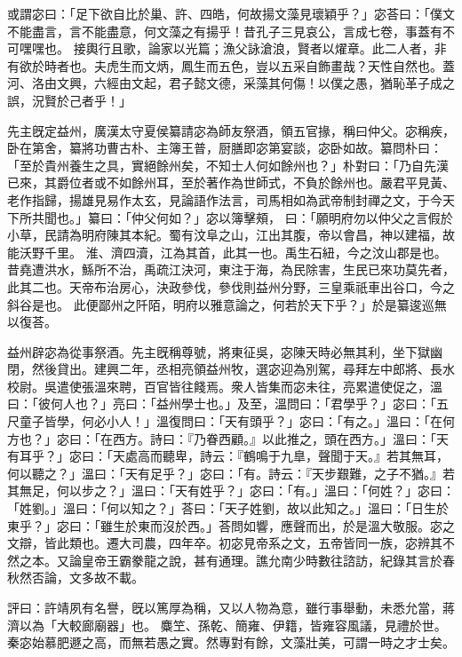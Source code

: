 \begin{pinyinscope}
 
或謂宓曰：「足下欲自比於巢、許、四皓，何故揚文藻見瓌穎乎？」宓荅曰：「僕文不能盡言，言不能盡意，何文藻之有揚乎！昔孔子三見哀公，言成七卷，事蓋有不可嘿嘿也。
 接輿行且歌，論家以光篇；漁父詠滄浪，賢者以燿章。此二人者，非有欲於時者也。夫虎生而文炳，鳳生而五色，豈以五采自飾畫哉？天性自然也。蓋河、洛由文興，六經由文起，君子懿文德，采藻其何傷！以僕之愚，猶恥革子成之誤，況賢於己者乎！」
 
 
先主旣定益州，廣漢太守夏侯纂請宓為師友祭酒，領五官掾，稱曰仲父。宓稱疾，卧在第舍，纂將功曹古朴、主簿王普，厨膳即宓第宴談，宓卧如故。纂問朴曰：「至於貴州養生之具，實絕餘州矣，不知士人何如餘州也？」朴對曰：「乃自先漢已來，其爵位者或不如餘州耳，至於著作為世師式，不負於餘州也。嚴君平見黃、老作指歸，揚雄見易作太玄，見論語作法言，司馬相如為武帝制封禪之文，于今天下所共聞也。」纂曰：「仲父何如？」宓以簿擊頰，
 曰：「願明府勿以仲父之言假於小草，民請為明府陳其本紀。蜀有汶阜之山，江出其腹，帝以會昌，神以建福，故能沃野千里。
 淮、濟四瀆，江為其首，此其一也。禹生石紐，今之汶山郡是也。
 昔堯遭洪水，鯀所不治，禹疏江決河，東注于海，為民除害，生民已來功莫先者，此其二也。天帝布治房心，決政參伐，參伐則益州分野，三皇乘祇車出谷口，今之斜谷是也。
 此便鄙州之阡陌，明府以雅意論之，何若於天下乎？」於是纂逡巡無以復荅。
 
 
 
 
 益州辟宓為從事祭酒。先主旣稱尊號，將東征吳，宓陳天時必無其利，坐下獄幽閉，然後貸出。建興二年，丞相亮領益州牧，選宓迎為別駕，尋拜左中郎將、長水校尉。吳遣使張溫來聘，百官皆往餞焉。衆人皆集而宓未往，亮累遣使促之，溫曰：「彼何人也？」亮曰：「益州學士也。」及至，溫問曰：「君學乎？」宓曰：「五尺童子皆學，何必小人！」溫復問曰：「天有頭乎？」宓曰：「有之。」溫曰：「在何方也？」宓曰：「在西方。詩曰：『乃眷西顧。』以此推之，頭在西方。」溫曰：「天有耳乎？」宓曰：「天處高而聽卑，詩云：『鶴鳴于九臯，聲聞于天。』若其無耳，何以聽之？」溫曰：「天有足乎？」宓曰：「有。詩云：『天步艱難，之子不猶。』若其無足，何以步之？」溫曰：「天有姓乎？」宓曰：「有。」溫曰：「何姓？」宓曰：「姓劉。」溫曰：「何以知之？」荅曰：「天子姓劉，故以此知之。」溫曰：「日生於東乎？」宓曰：「雖生於東而沒於西。」荅問如響，應聲而出，於是溫大敬服。宓之文辯，皆此類也。遷大司農，四年卒。初宓見帝系之文，五帝皆同一族，宓辨其不然之本。又論皇帝王霸豢龍之說，甚有通理。譙允南少時數往諮訪，紀錄其言於春秋然否論，文多故不載。
 
 
評曰：許靖夙有名譽，旣以篤厚為稱，又以人物為意，雖行事舉動，未悉允當，蔣濟以為「大較廊廟器」也。
 麋笁、孫乾、簡雍、伊籍，皆雍容風議，見禮於世。秦宓始慕肥遯之高，而無若愚之實。然專對有餘，文藻壯美，可謂一時之才士矣。
 
 
\end{pinyinscope}